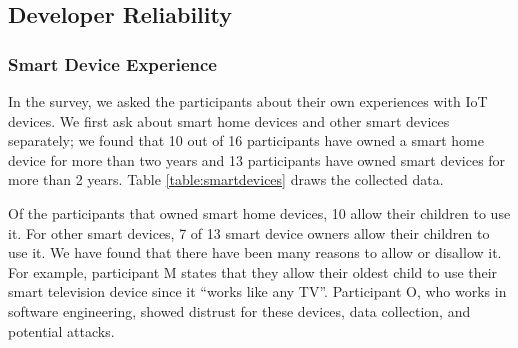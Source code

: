 \documentclass[12pt]{ucthesis}
\begin{document}
\subsection{Developer Reliability}
\subsubsection{Smart Device Experience}
In the survey, we asked the participants about their own experiences with IoT devices. We first ask about smart home devices and other smart devices separately; we found that 10 out of 16 participants have owned a smart home device for more than two years and 13 participants have owned smart devices for more than 2 years. Table \ref{table:smartdevices} draws the collected data.

Of the participants that owned smart home devices, 10 allow their children to use it. For other smart devices, 7 of 13 smart device owners allow their children to use it. We have found that there have been many reasons to allow or disallow it. For example, participant M states that they allow their oldest child to use their smart television device since it ``works like any TV''. Participant O, who works in software engineering, showed distrust for these devices, data collection, and potential attacks.
\end{document}
